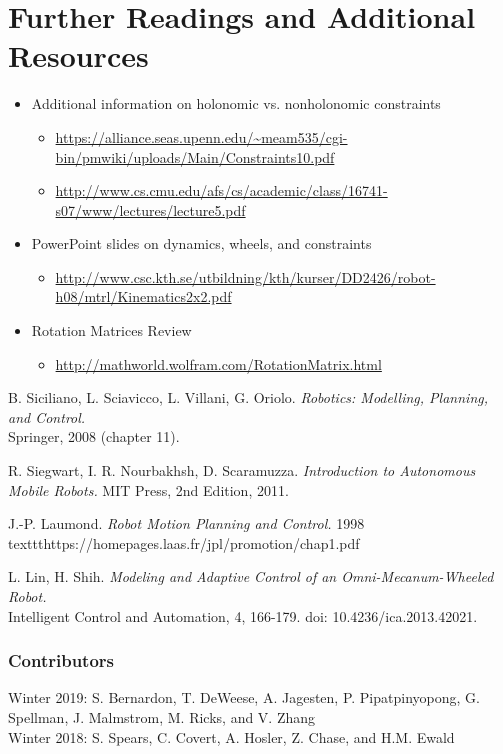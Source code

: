 \documentclass[twoside]{article}
\begin{document}
\section*{Further Readings and Additional Resources}

\begin{itemize}
   \item  Additional information on holonomic vs. nonholonomic constraints
   \begin{itemize}
     \item  \url{https://alliance.seas.upenn.edu/~meam535/cgi-bin/pmwiki/uploads/Main/Constraints10.pdf}
     \item \url{http://www.cs.cmu.edu/afs/cs/academic/class/16741-s07/www/lectures/lecture5.pdf}
   \end{itemize}
   \item PowerPoint slides on dynamics, wheels, and constraints
   \begin{itemize}
     \item  \url{http://www.csc.kth.se/utbildning/kth/kurser/DD2426/robot-h08/mtrl/Kinematics2x2.pdf}
   \end{itemize}
   \item Rotation Matrices Review
   \begin{itemize}
       \item \url{http://mathworld.wolfram.com/RotationMatrix.html}
   \end{itemize}
 \end{itemize}


\begin{thebibliography}{9}

B. Siciliano, L. Sciavicco, L. Villani, G. Oriolo.\textit{ Robotics: Modelling, Planning, and Control.} \\Springer, 2008 (chapter 11).

R. Siegwart, I. R. Nourbakhsh, D. Scaramuzza. \textit{Introduction to Autonomous Mobile Robots.} MIT Press, 2nd Edition, 2011.

J.-P. Laumond. \textit{Robot Motion Planning and Control.} 1998 \\texttt{https://homepages.laas.fr/jpl/promotion/chap1.pdf}

L. Lin, H. Shih. \textit{Modeling and Adaptive Control of an Omni-Mecanum-Wheeled Robot.} \\Intelligent Control and Automation, 4, 166-179. doi: 10.4236/ica.2013.42021.

\end{thebibliography}

\subsubsection*{Contributors}
Winter 2019: S. Bernardon, T. DeWeese,  A. Jagesten, P. Pipatpinyopong, G. Spellman, J. Malmstrom, M. Ricks, and V. Zhang
\\
Winter 2018: S. Spears, C. Covert, A. Hosler, Z. Chase, and H.M. Ewald
\end{document}
